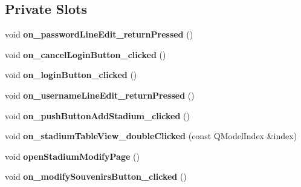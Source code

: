 \subsection*{Private Slots}
\begin{DoxyCompactItemize}
\item 
\mbox{\label{classadmin_window_a5103280c9df5284396543abbcfdfb9b0}} 
void {\bfseries on\+\_\+password\+Line\+Edit\+\_\+return\+Pressed} ()
\item 
\mbox{\label{classadmin_window_ababda5dfc198c2d5a740a69439438309}} 
void {\bfseries on\+\_\+cancel\+Login\+Button\+\_\+clicked} ()
\item 
\mbox{\label{classadmin_window_ae2fb0ef45daf7c5dc9c1be3c8d70ddfd}} 
void {\bfseries on\+\_\+login\+Button\+\_\+clicked} ()
\item 
\mbox{\label{classadmin_window_acda88c79d0311b10ca14365c758806b1}} 
void {\bfseries on\+\_\+username\+Line\+Edit\+\_\+return\+Pressed} ()
\item 
\mbox{\label{classadmin_window_a4335abd3c293747b320e7b33daa97ac9}} 
void {\bfseries on\+\_\+push\+Button\+Add\+Stadium\+\_\+clicked} ()
\item 
\mbox{\label{classadmin_window_af4d34bb5631807d4fdec44be2aba6f43}} 
void {\bfseries on\+\_\+stadium\+Table\+View\+\_\+double\+Clicked} (const Q\+Model\+Index \&index)
\item 
\mbox{\label{classadmin_window_acce92c02ca24ae9d6f3aea46ade5c32f}} 
void {\bfseries open\+Stadium\+Modify\+Page} ()
\item 
\mbox{\label{classadmin_window_af2ca6f61fc6981b6ea720993642fd7b6}} 
void {\bfseries on\+\_\+modify\+Souvenirs\+Button\+\_\+clicked} ()
\end{DoxyCompactItemize}
